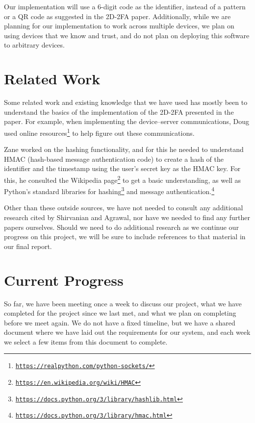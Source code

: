 \documentclass{article} %
\begin{document}
Our implementation will use a 6-digit code as the identifier, instead of
a pattern or a QR code as suggested in the 2D-2FA paper. Additionally,
while we are planning for our implementation to work across multiple
devices, we plan on using devices that we know and trust, and do not
plan on deploying this software to arbitrary devices.

\section{Related Work}

Some related work and existing knowledge that we have used has mostly
been to understand the basics of the implementation of the 2D-2FA
presented in the paper. For example, when implementing the
device--server communications, Doug used online
resources\footnote{\href{https://realpython.com/python-sockets/}{\texttt{https://realpython.com/python-sockets/}}}
to help figure out these communications.

Zane worked on the hashing functionality, and for this he needed to
understand HMAC (hash-based message authentication code) to create a
hash of the identifier and the timestamp using the user's secret key as
the HMAC key. For this, he consulted the Wikipedia
page\footnote{\href{https://en.wikipedia.org/wiki/HMAC}{\texttt{https://en.wikipedia.org/wiki/HMAC}}}
to get a basic understanding, as well as Python's standard libraries for
hashing\footnote{\href{https://docs.python.org/3/library/hashlib.html}{\texttt{https://docs.python.org/3/library/hashlib.html}}}
and message
authentication.\footnote{\href{https://docs.python.org/3/library/hmac.html}{\texttt{https://docs.python.org/3/library/hmac.html}}}

Other than these outside sources, we have not needed to consult any
additional research cited by Shirvanian and Agrawal, nor have we needed
to find any further papers ourselves. Should we need to do additional
research as we continue our progress on this project, we will be sure to
include references to that material in our final report. 

\section{Current Progress}

So far, we have been meeting once a week to discuss our project, what we
have completed for the project since we last met, and what we plan on
completing before we meet again. We do not have a fixed timeline, but we
have a shared document where we have laid out the requirements for our
system, and each week we select a few items from this document to
complete. 
\end{document}

